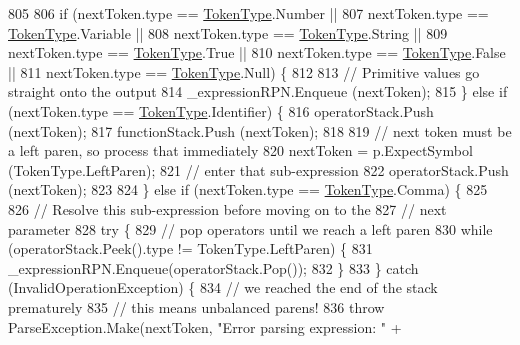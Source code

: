 \begin{DoxyCode}
805 
806                     \textcolor{keywordflow}{if} (nextToken.type == \hyperlink{a00051_a301aa7c866593a5b625a8fc158bbeace}{TokenType}.Number ||
807                         nextToken.type == \hyperlink{a00051_a301aa7c866593a5b625a8fc158bbeace}{TokenType}.Variable ||
808                         nextToken.type == \hyperlink{a00051_a301aa7c866593a5b625a8fc158bbeace}{TokenType}.String ||
809                         nextToken.type == \hyperlink{a00051_a301aa7c866593a5b625a8fc158bbeace}{TokenType}.True ||
810                         nextToken.type == \hyperlink{a00051_a301aa7c866593a5b625a8fc158bbeace}{TokenType}.False ||
811                         nextToken.type == \hyperlink{a00051_a301aa7c866593a5b625a8fc158bbeace}{TokenType}.Null) \{
812 
813                         \textcolor{comment}{// Primitive values go straight onto the output}
814                         \_expressionRPN.Enqueue (nextToken);
815                     \} \textcolor{keywordflow}{else} \textcolor{keywordflow}{if} (nextToken.type == \hyperlink{a00051_a301aa7c866593a5b625a8fc158bbeace}{TokenType}.Identifier) \{
816                         operatorStack.Push (nextToken);
817                         functionStack.Push (nextToken);
818 
819                         \textcolor{comment}{// next token must be a left paren, so process that immediately}
820                         nextToken = p.ExpectSymbol (TokenType.LeftParen);
821                         \textcolor{comment}{// enter that sub-expression}
822                         operatorStack.Push (nextToken);
823 
824                     \} \textcolor{keywordflow}{else} \textcolor{keywordflow}{if} (nextToken.type == \hyperlink{a00051_a301aa7c866593a5b625a8fc158bbeace}{TokenType}.Comma) \{
825 
826                         \textcolor{comment}{// Resolve this sub-expression before moving on to the}
827                         \textcolor{comment}{// next parameter}
828                         \textcolor{keywordflow}{try} \{
829                             \textcolor{comment}{// pop operators until we reach a left paren}
830                             \textcolor{keywordflow}{while} (operatorStack.Peek().type != TokenType.LeftParen) \{
831                                 \_expressionRPN.Enqueue(operatorStack.Pop());
832                             \}
833                         \} \textcolor{keywordflow}{catch} (InvalidOperationException) \{
834                             \textcolor{comment}{// we reached the end of the stack prematurely}
835                             \textcolor{comment}{// this means unbalanced parens!}
836                             \textcolor{keywordflow}{throw} ParseException.Make(nextToken, \textcolor{stringliteral}{"Error parsing expression: "} +

\end{DoxyCode}
